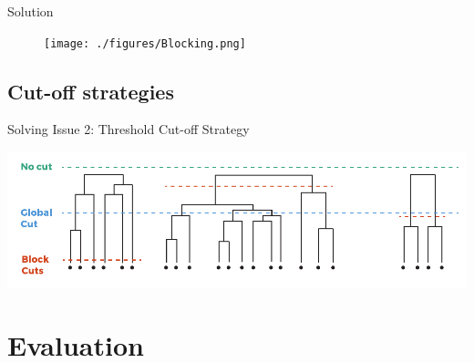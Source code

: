 \documentclass{beamer}
\begin{document}
\begin{frame} {Solution}


\begin{figure}
   \centering
   \texttt{[image: ./figures/Blocking.png]}
\end{figure}



\end{frame}




\subsection{Cut-off strategies}

\begin{frame} {Solving Issue 2: Threshold Cut-off Strategy}

\includegraphics[width=\textwidth]{./figures/fig-cuts.pdf}





\end{frame}



\section{Evaluation}
\end{document}
